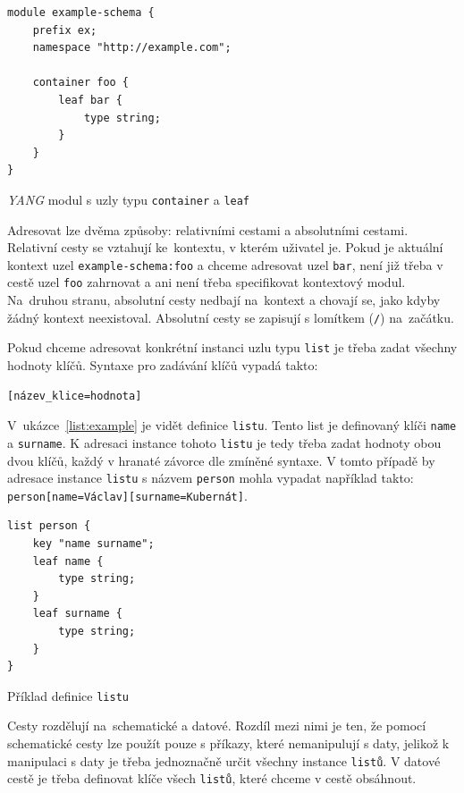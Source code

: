 \documentclass[thesis=B,czech,hidelinks]{FITthesis}[2019/03/06]
\begin{document}
\begin{listing}
\begin{verbatim}
module example-schema {
    prefix ex;
    namespace "http://example.com";

    container foo {
        leaf bar {
            type string;
        }
    }
}
\end{verbatim}
\caption{\textit{YANG} modul s uzly typu \texttt{container} a \texttt{leaf}}\label{yang:adresace}
\end{listing}

Adresovat lze dvěma způsoby: relativními cestami a absolutními cestami. Relativní cesty se vztahují ke~kontextu, v kterém uživatel je. Pokud je aktuální kontext uzel \texttt{example-schema:foo} a chceme adresovat uzel \texttt{bar}, není již třeba v cestě uzel \texttt{foo} zahrnovat a ani není třeba specifikovat kontextový modul. Na~druhou stranu, absolutní cesty nedbají na~kontext a chovají se, jako kdyby žádný kontext neexistoval. Absolutní cesty se zapisují s lomítkem (\texttt{/}) na~začátku.

Pokud chceme adresovat konkrétní instanci uzlu typu \texttt{list} je třeba zadat všechny hodnoty klíčů. Syntaxe pro zadávání klíčů vypadá takto:
\begin{verbatim}
[název_klice=hodnota]
\end{verbatim}
V~ukázce~\ref{list:example} je vidět definice \texttt{listu}. Tento list je definovaný klíči \texttt{name} a \texttt{surname}. K adresaci instance tohoto \texttt{listu} je tedy třeba zadat hodnoty obou dvou klíčů, každý v hranaté závorce dle zmíněné syntaxe. V tomto případě by adresace instance \texttt{listu} s názvem \texttt{person} mohla vypadat například takto: \verb¨person[name=Václav][surname=Kubernát]¨.

\begin{listing}[H]
\begin{verbatim}
list person {
    key "name surname";
    leaf name {
        type string;
    }
    leaf surname {
        type string;
    }
}
\end{verbatim}
\caption{Příklad definice \texttt{listu}}\label{list:example}
\end{listing}

Cesty rozdělují na~schematické a datové. Rozdíl mezi nimi je ten, že pomocí schematické cesty lze použít pouze s příkazy, které nemanipulují s daty, jelikož k manipulaci s daty je třeba jednoznačně určit všechny instance \texttt{listů}. V datové cestě je třeba definovat klíče všech \texttt{listů}, které chceme v cestě obsáhnout.
\end{document}
